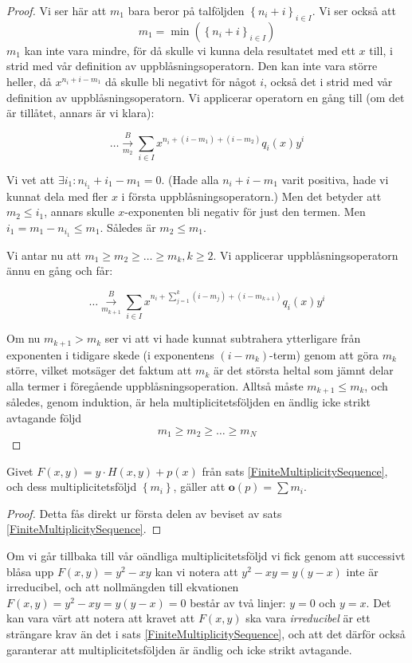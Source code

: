 \begin{proof}
Vi ser här att $m_1$ bara beror på talföljden $\left\{n_i+i\right\}_{i\in I}$. Vi ser också att
\[m_1=\min(\left\{n_i+i\right\}_{i\in I})\]
$m_1$ kan inte vara mindre, för då skulle vi kunna dela resultatet med ett $x$ till, i strid med vår definition av uppblåsningsoperatorn. Den kan inte vara större heller, då $x^{n_i+i-m_1}$ då skulle bli negativt för något $i$, också det i strid med vår definition av uppblåsningsoperatorn. Vi applicerar operatorn en gång till (om det är tillåtet, annars är vi klara):

\[\ldots \overset{B}{\underset{m_2}{\longrightarrow}} \sum_{i\in I} x^{n_i+(i-m_1)+(i-m_2)}q_i(x)y^i\]

Vi vet att $\exists i_1:n_{i_1}+i_1-m_1=0$. (Hade alla $n_i+i-m_1$ varit positiva, hade vi kunnat dela med fler $x$ i första uppblåsningsoperatorn.) Men det betyder att $m_2\leq i_1$, annars skulle $x$-exponenten bli negativ för just den termen. Men $i_1=m_1-n_{i_1}\leq m_1$. Således är $m_2\leq m_1$.

Vi antar nu att $m_1\geq m_2 \geq \ldots \geq m_k, k \geq 2$. Vi applicerar uppblåsnings\-operatorn ännu en gång och får:

\[\ldots \overset{B}{\underset{m_{k+1}}{\longrightarrow}} \sum_{i\in I} x^{n_i+\sum_{j=1}^{k} (i-m_j) + (i-m_{k+1})}q_i(x)y^i\]

Om nu $m_{k+1}>m_k$ ser vi att vi hade kunnat subtrahera ytterligare från exponenten i tidigare skede (i exponentens $(i-m_k)$-term) genom att göra $m_k$ större, vilket motsäger det faktum att $m_k$ är det största heltal som jämnt delar alla termer i föregående uppblåsningsoperation. Alltså måste $m_{k+1}\leq m_k$, och således, genom induktion, är hela multiplicitetsföljden en ändlig icke strikt avtagande följd
\[m_1 \geq m_2 \geq \ldots \geq m_N\]
\end{proof}

\begin{Corollary}
\label{OrderP}
Givet $F(x,y)=y\cdot H(x,y)+p(x)$ från sats \ref{FiniteMultiplicitySequence}, och dess multiplicitetsföljd $\left\{m_i\right\}$, gäller att $\mathbf{o}(p)=\sum m_i$.
\end{Corollary}

\begin{proof}
Detta fås direkt ur första delen av beviset av sats \ref{FiniteMultiplicitySequence}.
\end{proof}

Om vi går tillbaka till vår oändliga multiplicitetsföljd vi fick genom att successivt blåsa upp $F(x,y)=y^2-xy$ kan vi notera att $y^2-xy=y(y-x)$ inte är irreducibel, och att nollmängden till ekvationen $F(x,y)=y^2-xy=y(y-x)=0$ består av två linjer: $y=0$ och $y=x$. Det kan vara värt att notera att kravet att $F(x,y)$ ska vara \emph{irreducibel} är ett strängare krav än det i sats \ref{FiniteMultiplicitySequence}, och att det därför också garanterar att multiplicitetsföljden är ändlig och icke strikt avtagande.


